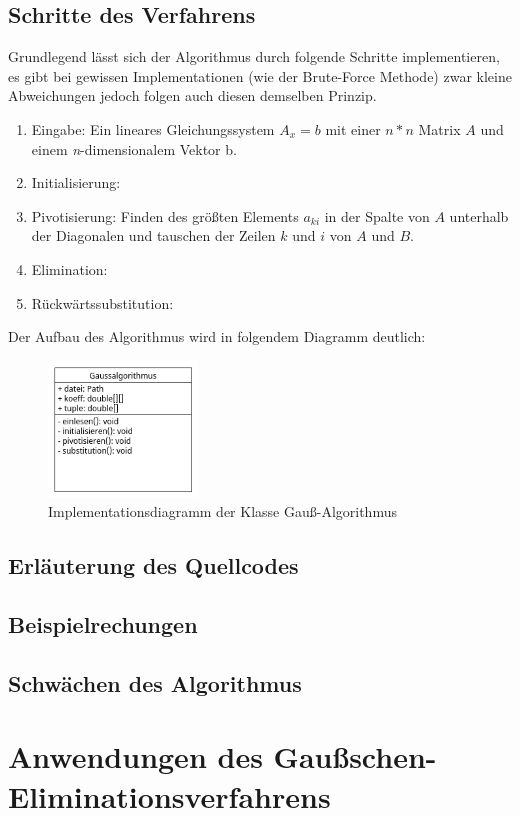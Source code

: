 \documentclass[a4paper, 12pt]{report}
\begin{document}
\begin{sloppypar}
\section{Schritte des Verfahrens}
Grundlegend lässt sich der Algorithmus durch folgende Schritte implementieren, es gibt bei gewissen Implementationen (wie der Brute-Force Methode)
zwar kleine Abweichungen jedoch folgen auch diesen demselben Prinzip.
\begin{enumerate}
    \item Eingabe: Ein lineares Gleichungssystem $ A_x=b $ mit einer $ n * n $ Matrix $A$ und einem \textit{n}-dimensionalem Vektor b.
    \item Initialisierung: %
    \item Pivotisierung: Finden des größten Elements $a_{ki}$ in der Spalte von $A$ unterhalb der Diagonalen und tauschen der Zeilen $k$ und $i$ von $A$ und $B$.
    \item Elimination: %
    \item Rückwärtssubstitution: %
\end{enumerate}
Der Aufbau des Algorithmus wird in folgendem Diagramm deutlich:
\begin{figure}[h]
    \centering
    \includegraphics[width=150px]{"./gaussuml.png"}
    \caption{Implementationsdiagramm der Klasse Gauß-Algorithmus}
\end{figure} \newpage
\section{Erläuterung des Quellcodes}


\section{Beispielrechungen}
\section{Schwächen des Algorithmus}
\chapter{Anwendungen des Gaußschen-Eliminationsverfahrens}

\end{sloppypar}
\end{document}
